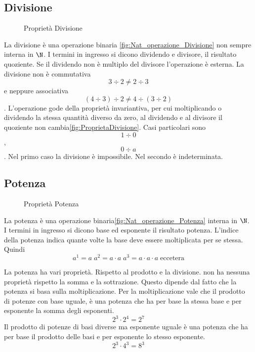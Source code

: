 \subsection{Divisione}
\label{sec:Numerinatdiv}
\begin{figure} %
	\centering

	\caption{Proprietà Divisione}\label{sec:NumerinatDiff}
	\label{fig:ProprietaDivisione}\end{figure}
La divisione è una operazione binaria \nobs\vref{fig:Nat_operazione_Divisione} non sempre interna in $\N$. I termini in ingresso si dicono dividendo e divisore, il risultato quoziente. Se il dividendo non è  multiplo  del divisore l'operazione è esterna. La divisione non è commutativa \[3\div2\neq2\div3\] e neppure associativa \[(4\div3)\div2\neq4\div(3\div2)\]. L'operazione gode della proprietà invariantiva, per cui moltiplicando  o dividendo la stessa quantità diverso da zero, al dividendo e al divisore il quoziente non cambia\nobs\vref{fig:ProprietaDivisione}. Casi particolari sono \[1\div0\], \[0\div a\]. Nel primo caso la divisione è impossibile. Nel secondo è indeterminata.
\subsection{Potenza}
\label{sec:NumerinatPot}
\begin{figure} %
	\centering

	\caption{Proprietà Potenza}
	\label{fig:ProprietaPotenza}\end{figure}
La potenza è una operazione binaria\nobs\vref{fig:Nat_operazione_Potenza}  interna in $\N$. I termini in ingresso si dicono base ed esponente il risultato potenza. L'indice della potenza indica quante volte la base deve essere moltiplicata per se stessa. Quindi\[a^1=a\; a^2=a\cdot a\; a^3=a\cdot a\cdot a\; \text{eccetera} \] 

La potenza ha vari proprietà. Rispetto al prodotto e la divisione. non ha nessuna proprietà rispetto la somma e la sottrazione. Questo dipende dal fatto che la potenza si basa sulla moltiplicazione. 
Per la moltiplicazione vale che il prodotto di potenze con base uguale, è una potenza che ha per base la stessa base e per esponente la somma degli esponenti.\[ 2^3\cdot 2^4=2^7 \] Il prodotto di potenze di basi diverse ma esponente uguale è una potenza che ha per base il prodotto delle basi e per esponente lo stesso esponente.\[2^3\cdot 4^3=8^3\] 

